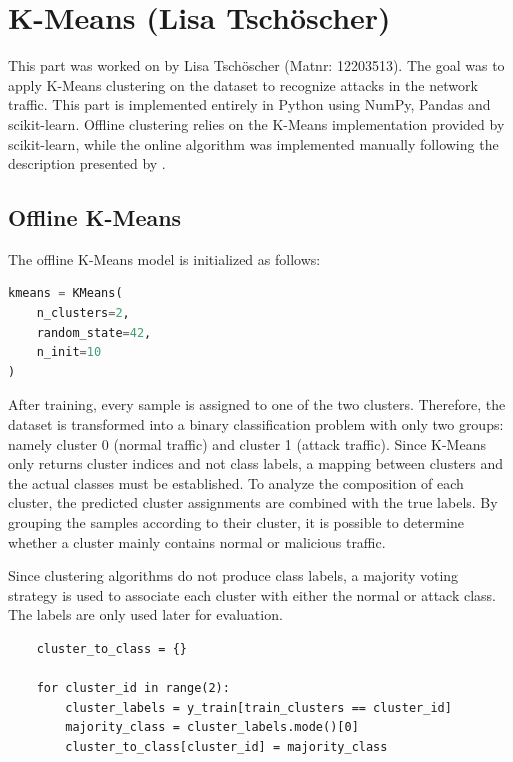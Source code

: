 \section{K-Means (Lisa Tschöscher) }
This part was worked on by Lisa Tschöscher (Matnr: 12203513). The goal was to apply K-Means clustering on the dataset to recognize attacks in the network traffic. This part is implemented entirely in Python using NumPy, Pandas and scikit-learn. Offline clustering relies on the K-Means implementation provided by scikit-learn, while the online algorithm was implemented manually following the description presented by \cite{kMeans}.

\subsection{Offline K-Means}
The offline K-Means model is initialized as follows:

\begin{lstlisting}[language=Python]
kmeans = KMeans(
    n_clusters=2,
    random_state=42,
    n_init=10
)
\end{lstlisting}

\nextparagraph
After training, every sample is assigned to one of the two clusters. Therefore, the dataset is transformed into a binary classification problem with only two groups: namely cluster 0 (normal traffic) and cluster 1 (attack traffic). Since K-Means only returns cluster indices and not class labels, a mapping between clusters and the actual classes must be established. To analyze the composition of each cluster, the predicted cluster assignments are combined with the true labels. By grouping the samples according to their cluster, it is possible to determine whether a cluster mainly contains normal or malicious traffic.

\nextparagraph
Since clustering algorithms do not produce class labels, a majority voting strategy is used to associate each cluster with either the normal or attack class. The labels are only used later for evaluation.\\

\begin{lstlisting}
    cluster_to_class = {}
    
    for cluster_id in range(2):
        cluster_labels = y_train[train_clusters == cluster_id]
        majority_class = cluster_labels.mode()[0]
        cluster_to_class[cluster_id] = majority_class
\end{lstlisting}

